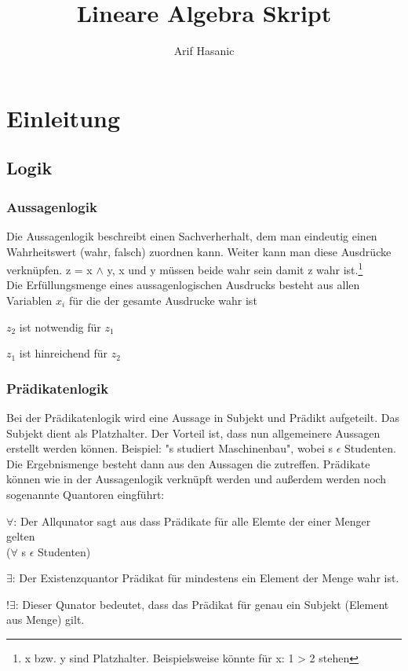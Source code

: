 \documentclass[a4paper,10pt]{scrartcl}
\title{Lineare Algebra Skript}
\author{Arif Hasanic}
\begin{document}
    \maketitle
    \newpage
    \tableofcontents
    \newpage

    \section{Einleitung}
        \subsection{Logik}

        \subsubsection{Aussagenlogik}
        Die Aussagenlogik beschreibt einen Sachverherhalt, dem man eindeutig einen 
        Wahrheitswert (wahr, falsch) zuordnen kann. Weiter kann man diese Ausdrücke verknüpfen. 
        z = x $\wedge$ y,   x und y müssen beide wahr sein damit z wahr ist.\footnote{x bzw. y sind Platzhalter. Beispielsweise könnte für x: 1 > 2 stehen} \\
        Die Erfüllungsmenge eines aussagenlogischen Ausdrucks besteht aus allen Variablen $x_i$ für die der gesamte Ausdrucke wahr ist
        \begin{description}
            \item[$z_1 \Rightarrow z_2$]
            \item $z_2$ ist notwendig für $z_1$ 
            \item $z_1$ ist hinreichend für $z_2$
        \end{description}

        \subsubsection{Prädikatenlogik}
        Bei der Prädikatenlogik wird eine Aussage in Subjekt und Prädikt aufgeteilt. Das Subjekt dient als Platzhalter. Der Vorteil ist, dass nun 
        allgemeinere Aussagen erstellt werden können. Beispiel: "s studiert Maschinenbau", wobei s $\epsilon$ Studenten. \\
        Die Ergebnismenge besteht dann aus den Aussagen die zutreffen. Prädikate können wie in der Aussagenlogik verknüpft werden und außerdem werden noch sogenannte
        Quantoren eingführt:
        \begin{description}
            \item $\forall$: Der Allqunator sagt aus dass  Prädikate für alle Elemte der einer Menger gelten \\($\forall$ s $\epsilon$ Studenten)
            \item $\exists$: Der Existenzquantor Prädikat für mindestens ein Element der Menge wahr ist.
            \item $!\exists$: Dieser Qunator bedeutet, dass das Prädikat für genau ein Subjekt (Element aus Menge) gilt.
        \end{description} 
\end{document}
